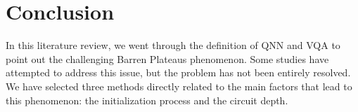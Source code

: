 \section{Conclusion}
In this literature review, we went through the definition of QNN and VQA to point out the challenging Barren Plateaus phenomenon. 
Some studies have attempted to address this issue, but the problem has not been entirely resolved.
We have selected three methods directly related to the main factors that lead to this phenomenon: the initialization process and the circuit depth.  